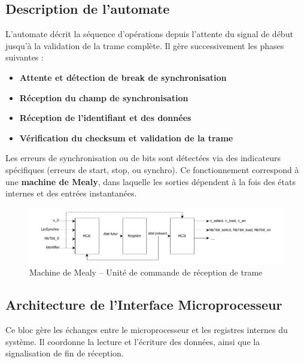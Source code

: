 \subsection*{Description de l’automate}

L’automate décrit la séquence d’opérations depuis l’attente du signal de début jusqu’à la validation de la trame complète.  
Il gère successivement les phases suivantes :
\begin{itemize}
    \item \textbf{Attente et détection de break de synchronisation}
    \item \textbf{Réception du champ de synchronisation}
    \item \textbf{Réception de l’identifiant et des données}
    \item \textbf{Vérification du checksum et validation de la trame}
\end{itemize}

Les erreurs de synchronisation ou de bits sont détectées via des indicateurs spécifiques (erreurs de start, stop, ou synchro).  
Ce fonctionnement correspond à une \textbf{machine de Mealy}, dans laquelle les sorties dépendent à la fois des états internes et des entrées instantanées.

\begin{figure}[H]
    \centering
    \includegraphics[width=0.8\linewidth]{images/inter/MEALY_Reception_trame.pdf}
    \caption{Machine de Mealy – Unité de commande de réception de trame}
    \label{fig:mealy_reception}
\end{figure}

\subsection{Architecture de l’Interface Microprocesseur}

Ce bloc gère les échanges entre le microprocesseur et les registres internes du système.  
Il coordonne la lecture et l’écriture des données, ainsi que la signalisation de fin de réception.


